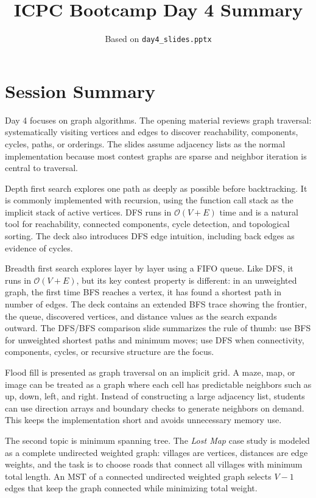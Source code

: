 \documentclass[11pt]{article}
\title{ICPC Bootcamp Day 4 Summary}
\author{Based on \texttt{day4\_slides.pptx}}
\date{}
\begin{document}
\maketitle

\section*{Session Summary}
Day 4 focuses on graph algorithms. The opening material reviews graph traversal: systematically visiting vertices and edges to discover reachability, components, cycles, paths, or orderings. The slides assume adjacency lists as the normal implementation because most contest graphs are sparse and neighbor iteration is central to traversal.

Depth first search explores one path as deeply as possible before backtracking. It is commonly implemented with recursion, using the function call stack as the implicit stack of active vertices. DFS runs in \(\mathcal{O}(V+E)\) time and is a natural tool for reachability, connected components, cycle detection, and topological sorting. The deck also introduces DFS edge intuition, including back edges as evidence of cycles.

Breadth first search explores layer by layer using a FIFO queue. Like DFS, it runs in \(\mathcal{O}(V+E)\), but its key contest property is different: in an unweighted graph, the first time BFS reaches a vertex, it has found a shortest path in number of edges. The deck contains an extended BFS trace showing the frontier, the queue, discovered vertices, and distance values as the search expands outward. The DFS/BFS comparison slide summarizes the rule of thumb: use BFS for unweighted shortest paths and minimum moves; use DFS when connectivity, components, cycles, or recursive structure are the focus.

Flood fill is presented as graph traversal on an implicit grid. A maze, map, or image can be treated as a graph where each cell has predictable neighbors such as up, down, left, and right. Instead of constructing a large adjacency list, students can use direction arrays and boundary checks to generate neighbors on demand. This keeps the implementation short and avoids unnecessary memory use.

The second topic is minimum spanning tree. The \textit{Lost Map} case study is modeled as a complete undirected weighted graph: villages are vertices, distances are edge weights, and the task is to choose roads that connect all villages with minimum total length. An MST of a connected undirected weighted graph selects \(V-1\) edges that keep the graph connected while minimizing total weight.
\end{document}
